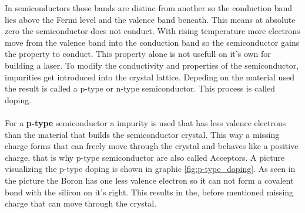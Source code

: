 In semiconductors those bands are distinc from another so the conduction band lies above the Fermi level and the valence band beneath.
This means at absolute zero the semiconductor does not conduct.
With rising temperature more electrons move from the valence band into the conduction band so the semiconductor gains the property to conduct.
This property alone is not usefull on it's own for building a laser.
To modify the conductivity and properties of the semiconductor, impurities get introduced into the crystal lattice.
Depeding on the material used the result is called a p-type or n-type semiconductor.
This process is called doping.
\\\\
\FloatBarrier
For a \textbf{p-type} semiconductor a impurity is used that has less valence electrons than the material that builds the semiconductor crystal.
This way a missing charge forms that can freely move through the crystal and behaves like a positive charge, that is why p-type semiconductor are also called Acceptors.
A picture visualizing the p-type doping is shown in graphic \ref{fig:p-type_doping}.
As seen in the picture the Boron has one less valence electron so it can not form a covalent bond with the silicon on it's right.
This results in the, before mentioned missing charge that can move through the crystal.
